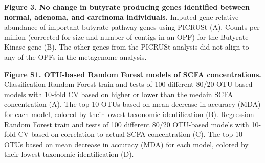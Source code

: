 \documentclass[11pt,]{article}
\begin{document}
\textbf{Figure 3. No change in butyrate producing genes identified
between normal, adenoma, and carcinoma individuals.} Imputed gene
relative abundance of important butyrate pathway genes using PICRUSt
(A). Counts per million (corrected for size and number of contigs in an
OPF) for the Butyrate Kinase gene (B). The other genes from the PICRUSt
analysis did not align to any of the OPFs in the metagenome analysis.

\newpage

\textbf{Figure S1. OTU-based Random Forest models of SCFA
concentrations.} Classification Random Forest train and tests of 100
different 80/20 OTU-based models with 10-fold CV based on higher or
lower than the medain SCFA concentration (A). The top 10 OTUs based on
mean decrease in accuracy (MDA) for each model, colored by their lowest
taxonomic identification (B). Regression Random Forest train and tests
of 100 different 80/20 OTU-based models with 10-fold CV based on
correlation to actual SCFA concentration (C). The top 10 OTUs based on
mean decrease in accuracy (MDA) for each model, colored by their lowest
taxonomic identification (D).
\end{document}
